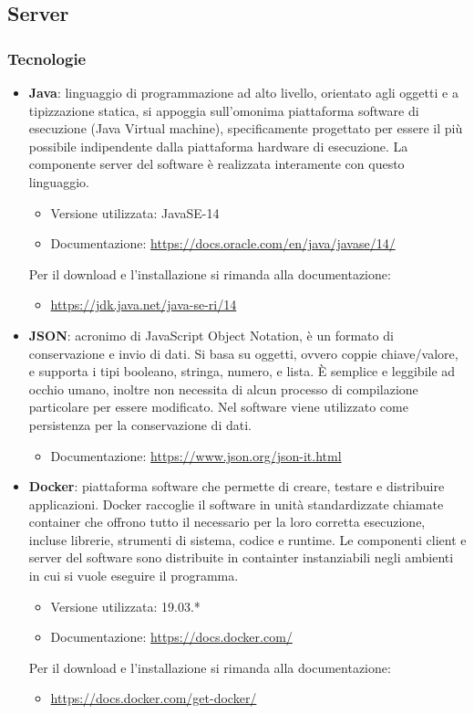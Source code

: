 \subsection{Server}

\subsubsection{Tecnologie}
\label{tecnologie}

\begin{itemize}
	\item \textbf{Java}: linguaggio di programmazione ad alto livello, orientato agli oggetti e a tipizzazione statica, si appoggia sull'omonima piattaforma software di esecuzione (Java Virtual machine), specificamente progettato per essere il più possibile indipendente dalla piattaforma hardware di esecuzione. La componente server del software è realizzata interamente con questo linguaggio.
	\begin{itemize}
		\item Versione utilizzata: JavaSE-14
		\item Documentazione: \url{https://docs.oracle.com/en/java/javase/14/}
	\end{itemize}
	Per il download e l'installazione si rimanda alla documentazione:
	\begin{itemize}
		\item \url{https://jdk.java.net/java-se-ri/14}
	\end{itemize}

	\item \textbf{JSON}: acronimo di JavaScript Object Notation, è un formato di conservazione e invio di dati. Si basa su oggetti, ovvero coppie chiave/valore, e supporta i tipi booleano, stringa, numero, e lista. È semplice e leggibile ad occhio umano, inoltre non necessita di alcun processo di
	compilazione particolare per essere modificato. Nel software viene utilizzato come persistenza per la conservazione di dati.
	\begin{itemize}
		\item Documentazione: \url{https://www.json.org/json-it.html}
	\end{itemize}

	\item \textbf{Docker}: piattaforma software che permette di creare, testare e distribuire applicazioni. Docker raccoglie il software in unità standardizzate chiamate container che offrono tutto il necessario per la loro corretta esecuzione, incluse librerie, strumenti di sistema, codice e runtime. Le componenti client e server del software sono distribuite in containter instanziabili negli ambienti in cui si vuole eseguire il programma.
	\begin{itemize}
		\item Versione utilizzata: 19.03.*
		\item Documentazione: \url{https://docs.docker.com/}
	\end{itemize}
	Per il download e l'installazione si rimanda alla documentazione:
	\begin{itemize}
		\item \url{https://docs.docker.com/get-docker/}
	\end{itemize}


\end{itemize}
